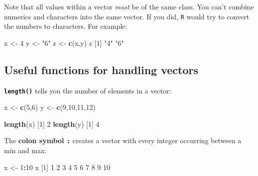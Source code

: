 \documentclass[
]{book}
\newenvironment{Shaded}{\begin{snugshade}}{\end{snugshade}}
\newcommand{\DecValTok}[1]{\textcolor[rgb]{0.00,0.00,0.81}{#1}}
\newcommand{\KeywordTok}[1]{\textcolor[rgb]{0.13,0.29,0.53}{\textbf{#1}}}
\newcommand{\NormalTok}[1]{#1}
\newcommand{\OperatorTok}[1]{\textcolor[rgb]{0.81,0.36,0.00}{\textbf{#1}}}
\newcommand{\StringTok}[1]{\textcolor[rgb]{0.31,0.60,0.02}{#1}}
\begin{document}
Note that all values within a vector \emph{must} be of the same class. You can't combine numerics and characters into the same vector. If you did, \texttt{R} would try to convert the numbers to characters. For example:

\begin{Shaded}
\begin{Highlighting}[]
\NormalTok{x <-}\StringTok{ }\DecValTok{4}
\NormalTok{y <-}\StringTok{ "6"}
\NormalTok{z <-}\StringTok{ }\KeywordTok{c}\NormalTok{(x,y)}
\NormalTok{z}
\NormalTok{[}\DecValTok{1}\NormalTok{] }\StringTok{"4"} \StringTok{"6"}
\end{Highlighting}
\end{Shaded}

\hypertarget{useful-functions-for-handling-vectors}{%
\subsection*{Useful functions for handling vectors}\label{useful-functions-for-handling-vectors}}

\textbf{\texttt{length()}} tells you the number of elements in a vector:

\begin{Shaded}
\begin{Highlighting}[]
\NormalTok{x <-}\StringTok{ }\KeywordTok{c}\NormalTok{(}\DecValTok{5}\NormalTok{,}\DecValTok{6}\NormalTok{)}
\NormalTok{y <-}\StringTok{ }\KeywordTok{c}\NormalTok{(}\DecValTok{9}\NormalTok{,}\DecValTok{10}\NormalTok{,}\DecValTok{11}\NormalTok{,}\DecValTok{12}\NormalTok{)}

\KeywordTok{length}\NormalTok{(x)}
\NormalTok{[}\DecValTok{1}\NormalTok{] }\DecValTok{2}
\KeywordTok{length}\NormalTok{(y)}
\NormalTok{[}\DecValTok{1}\NormalTok{] }\DecValTok{4}
\end{Highlighting}
\end{Shaded}

The \textbf{colon symbol \texttt{:}} creates a vector with every integer occurring between a min and max:

\begin{Shaded}
\begin{Highlighting}[]
\NormalTok{x <-}\StringTok{ }\DecValTok{1}\OperatorTok{:}\DecValTok{10}
\NormalTok{x}
\NormalTok{ [}\DecValTok{1}\NormalTok{]  }\DecValTok{1}  \DecValTok{2}  \DecValTok{3}  \DecValTok{4}  \DecValTok{5}  \DecValTok{6}  \DecValTok{7}  \DecValTok{8}  \DecValTok{9} \DecValTok{10}
\end{Highlighting}
\end{Shaded}
\end{document}
